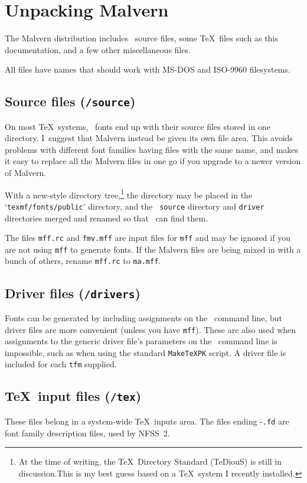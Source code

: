 \section{Unpacking Malvern}
	The Malvern distribution includes \MF\ source files, some \TeX\
	files such as this documentation, and a few other miscellaneous
	files.  

	All files have names that should work with MS-DOS and ISO-9960
	filesystems.

\subsection{Source files ({\tt/source})}
	On most \TeX\ systems, \MF\ fonts end up with their source files
	stored in one directory.  I~suggest that Malvern instead be
	given its own file area.  This avoids problems with different
	font families having files with the same name, and makes it easy
	to replace all the Malvern files in one go if you upgrade to a
	newer version of Malvern.

	With a new-style directory tree,\footnote*{At the time of
	writing, the \TeX\ Directory Standard (TeDiouS) is still in
	discussion.\break   This is my best guess based on a \TeX\ system I
	recently installed.} the {\tt\ttpackage} directory may be
	placed in the `{\tt texmf/fonts/public}' directory, and the {\tt
	source} directory and {\tt driver} directories merged and
	renamed so that \MF\ can find them.

	The files {\tt mff.rc} and {\tt fmv.mff} are input files for
	{\tt mff} and may be ignored if you are not using {\tt mff} to
	generate fonts.  If the Malvern files are being mixed in with a
	bunch of others, rename {\tt mff.rc} to {\tt ma.mff}.

\subsection{Driver files ({\tt/drivers})}
	Fonts can be generated by including assignments on the \MF\
	command line, but driver files are more convenient (unless you
	have {\tt mff}).  These are also used when assignments to the
	generic driver file's parameters on the \MF\ command line is
	impossible, such as when using the standard {\tt MakeTeXPK}
	script.  A driver file is included for each {\tt tfm} supplied.

\subsection{\TeX\ input files ({\tt/tex})}
	These files belong in a system-wide \TeX\ inputs area.  The
	files ending -{\tt.fd} are font family description files, used
	by NFSS~2.

